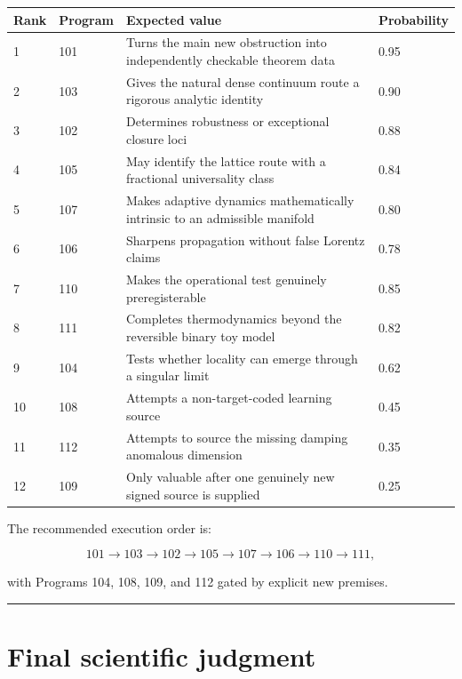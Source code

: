 \documentclass[11pt,a4paper,openany]{report}
\begin{document}
\begin{center}
\begingroup\small
\setlength{\tabcolsep}{3.5pt}
\renewcommand{\arraystretch}{1.16}
\begin{longtable}{@{}p{}p{}p{}p{}@{}}
\toprule
\textbf{Rank} & \textbf{Program} & \textbf{Expected value} & \textbf{Probability} \\
\midrule
\endhead
1 & 101 & Turns the main new obstruction into independently checkable theorem data & 0.95 \\
2 & 103 & Gives the natural dense continuum route a rigorous analytic identity & 0.90 \\
3 & 102 & Determines robustness or exceptional closure loci & 0.88 \\
4 & 105 & May identify the lattice route with a fractional universality class & 0.84 \\
5 & 107 & Makes adaptive dynamics mathematically intrinsic to an admissible manifold & 0.80 \\
6 & 106 & Sharpens propagation without false Lorentz claims & 0.78 \\
7 & 110 & Makes the operational test genuinely preregisterable & 0.85 \\
8 & 111 & Completes thermodynamics beyond the reversible binary toy model & 0.82 \\
9 & 104 & Tests whether locality can emerge through a singular limit & 0.62 \\
10 & 108 & Attempts a non-target-coded learning source & 0.45 \\
11 & 112 & Attempts to source the missing damping anomalous dimension & 0.35 \\
12 & 109 & Only valuable after one genuinely new signed source is supplied & 0.25 \\
\bottomrule
\end{longtable}
\endgroup
\end{center}

The recommended execution order is:

\[
101
\rightarrow
103
\rightarrow
102
\rightarrow
105
\rightarrow
107
\rightarrow
106
\rightarrow
110
\rightarrow
111,
\]

with Programs 104, 108, 109, and 112 gated by explicit new premises.

\par\medskip\hrule\medskip

\chapter{Final scientific judgment}
\end{document}
